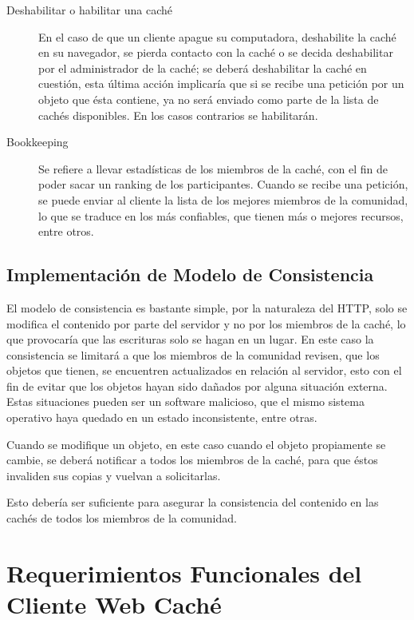 \begin{description}
\item[Deshabilitar o habilitar una caché] En el caso de que un cliente apague su computadora, deshabilite la caché en su navegador, se pierda contacto con la caché o se decida deshabilitar por el administrador de la caché; se deberá deshabilitar la caché en cuestión, esta última acción implicaría que si se recibe una petición por un objeto que ésta contiene, ya no será enviado como parte de la lista de cachés disponibles. En los casos contrarios se habilitarán.

\item [Bookkeeping] Se refiere a llevar estadísticas de los miembros de la caché, con el fin de poder sacar un ranking de los participantes. Cuando se recibe una petición, se puede enviar al cliente la lista de los mejores miembros de la comunidad, lo que se traduce en los más confiables, que tienen más o mejores recursos, entre otros.

\end{description}


\subsection{Implementación de Modelo de Consistencia}
El modelo de consistencia es bastante simple, por la naturaleza del HTTP, solo se modifica el contenido por parte del servidor y no por los miembros de la caché, lo que provocaría que las escrituras solo se hagan en un lugar. En este caso la consistencia se limitará a que los miembros de la comunidad revisen, que los objetos que tienen, se encuentren actualizados en relación al servidor, esto con el fin de evitar que los objetos hayan sido dañados por alguna situación externa. Estas situaciones pueden ser un software malicioso, que el mismo sistema operativo haya quedado en un estado inconsistente, entre otras.

Cuando se modifique un objeto, en este caso cuando el objeto propiamente se cambie, se deberá notificar a todos los miembros de la caché, para que éstos invaliden sus copias y vuelvan a solicitarlas. 

Esto debería ser suficiente para asegurar la consistencia del contenido en las cachés de todos los miembros de la comunidad. 


\section{Requerimientos Funcionales del Cliente Web Caché}

